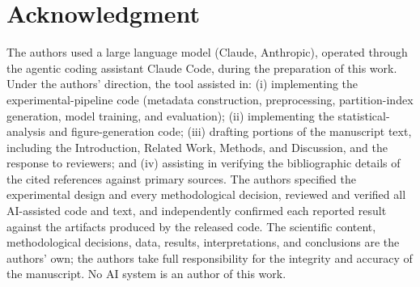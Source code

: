 \documentclass{article}
\begin{document}
\section*{Acknowledgment}
The authors used a large language model (Claude, Anthropic), operated through the agentic coding
assistant Claude Code, during the preparation of this work. Under the authors' direction, the tool
assisted in: (i) implementing the experimental-pipeline code (metadata construction, preprocessing,
partition-index generation, model training, and evaluation); (ii) implementing the
statistical-analysis and figure-generation code; (iii) drafting portions of the manuscript text,
including the Introduction, Related Work, Methods, and Discussion, and the response to reviewers;
and (iv) assisting in verifying the bibliographic details of the cited references against primary
sources. The authors specified the experimental design and every methodological decision, reviewed
and verified all AI-assisted code and text, and independently confirmed each reported result against
the artifacts produced by the released code. The scientific content, methodological decisions, data,
results, interpretations, and conclusions are the authors' own; the authors take full responsibility
for the integrity and accuracy of the manuscript. No AI system is an author of this work.
\end{document}
